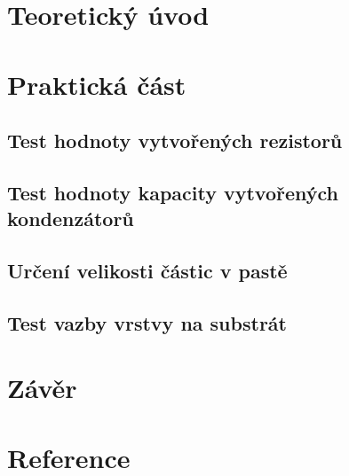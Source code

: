 \documentclass{protokol}
\begin{document}
	\maketitle

\section{Teoretický úvod}
  

\section{Praktická část}
\subsection{Test hodnoty vytvořených rezistorů}
  
  \clearpage
\subsection{Test hodnoty kapacity vytvořených kondenzátorů}
  
  \clearpage
\subsection{Určení velikosti částic v pastě}
  
  \clearpage
\subsection{Test vazby vrstvy na substrát}
  
  \clearpage

\section{Závěr}
  
  

\section*{Reference}
\printbibliography[heading=none]



% 
\end{document}
